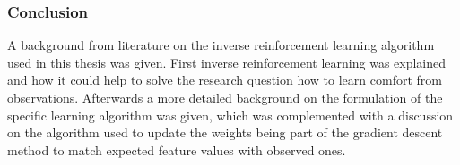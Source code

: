 %
%
%
%


\subsubsection{Conclusion}
A background from literature on the inverse reinforcement learning algorithm used in this thesis was given. First inverse reinforcement learning was explained and how it could help to solve the research question how to learn comfort from observations. Afterwards a more detailed background on the formulation of the specific learning algorithm was given, which was complemented with a discussion on the algorithm used to update the weights being part of the gradient descent method to match expected feature values with observed ones.
\newpage


